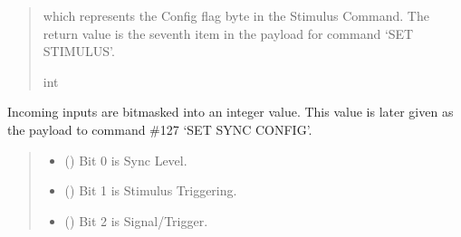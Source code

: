 \documentclass[letterpaper,10pt,english]{sphinxmanual}
\begin{document}
\begin{fulllineitems}
\begin{fulllineitems}
\begin{quote}
\begin{description}
\begin{itemize}
\end{itemize}

\sphinxAtStartPar
which represents the Config flag byte in the Stimulus Command.                 The return value is the seventh item in the payload for command ‘SET STIMULUS’.

\sphinxAtStartPar
int

\end{description}\end{quote}

\end{fulllineitems}


\begin{fulllineitems}
\label{\detokenize{Morelia.Devices:Morelia.Devices.PodDevice_8480SC.Pod8480SC.SyncConfigBits}}
\pysigstartsignatures
{}
\pysigstopsignatures
\sphinxAtStartPar
Incoming inputs are bitmasked into an integer value. This value is later given         as the payload to command \#127 ‘SET SYNC CONFIG’.
\begin{quote}\begin{description}
\begin{itemize}
\item {} 
\sphinxAtStartPar
{} () \textendash{} Bit 0 is Sync Level.

\item {} 
\sphinxAtStartPar
{} () \textendash{} Bit 1 is Stimulus Triggering.

\item {} 
\sphinxAtStartPar
{} () \textendash{} Bit 2 is Signal/Trigger.


\end{itemize}
\end{description}
\end{quote}
\end{fulllineitems}
\end{fulllineitems}
\end{document}
